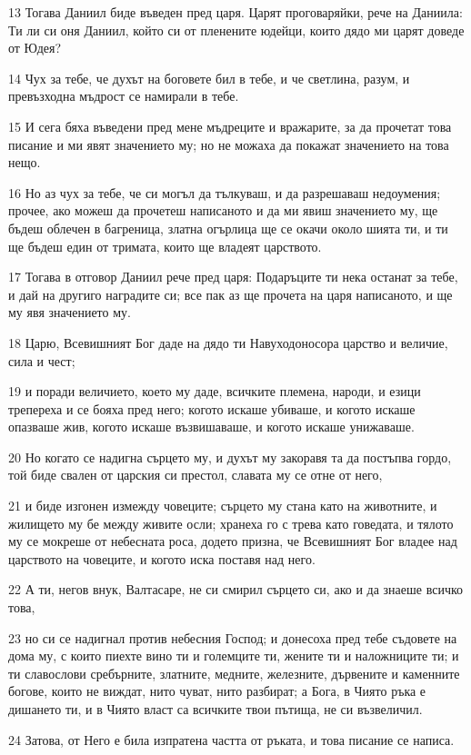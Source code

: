 \par 13 Тогава Даниил биде въведен пред царя. Царят проговаряйки, рече на Даниила: Ти ли си оня Даниил, който си от пленените юдейци, които дядо ми царят доведе от Юдея?
\par 14 Чух за тебе, че духът на боговете бил в тебе, и че светлина, разум, и превъзходна мъдрост се намирали в тебе.
\par 15 И сега бяха въведени пред мене мъдреците и вражарите, за да прочетат това писание и ми явят значението му; но не можаха да покажат значението на това нещо.
\par 16 Но аз чух за тебе, че си могъл да тълкуваш, и да разрешаваш недоумения; прочее, ако можеш да прочетеш написаното и да ми явиш значението му, ще бъдеш облечен в багреница, златна огърлица ще се окачи около шията ти, и ти ще бъдеш един от тримата, които ще владеят царството.
\par 17 Тогава в отговор Даниил рече пред царя: Подаръците ти нека останат за тебе, и дай на другиго наградите си; все пак аз ще прочета на царя написаното, и ще му явя значението му.
\par 18 Царю, Всевишният Бог даде на дядо ти Навуходоносора царство и величие, сила и чест;
\par 19 и поради величието, което му даде, всичките племена, народи, и езици трепереха и се бояха пред него; когото искаше убиваше, и когото искаше опазваше жив, когото искаше възвишаваше, и когото искаше унижаваше.
\par 20 Но когато се надигна сърцето му, и духът му закоравя та да постъпва гордо, той биде свален от царския си престол, славата му се отне от него,
\par 21 и биде изгонен измежду човеците; сърцето му стана като на животните, и жилището му бе между живите осли; хранеха го с трева като говедата, и тялото му се мокреше от небесната роса, додето призна, че Всевишният Бог владее над царството на човеците, и когото иска поставя над него.
\par 22 А ти, негов внук, Валтасаре, не си смирил сърцето си, ако и да знаеше всичко това,
\par 23 но си се надигнал против небесния Господ; и донесоха пред тебе съдовете на дома му, с които пиехте вино ти и големците ти, жените ти и наложниците ти; и ти славослови сребърните, златните, медните, железните, дървените и каменните богове, които не виждат, нито чуват, нито разбират; а Бога, в Чиято ръка е дишането ти, и в Чиято власт са всичките твои пътища, не си възвеличил.
\par 24 Затова, от Него е била изпратена частта от ръката, и това писание се написа.
